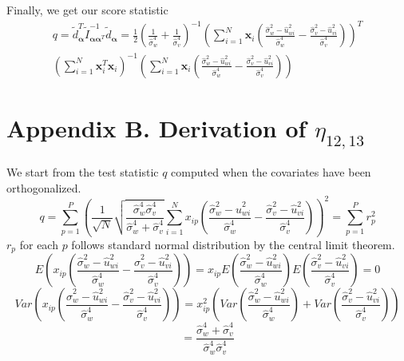 \documentclass[aap,authoryear, preprint]{imsart}
\numberwithin{equation}{section}
\theoremstyle{plain}
\begin{document}
Finally, we get our score statistic
\begin{equation}
    \begin{multlined}
    q = \tilde{d}_{\bm{\alpha}}^T \tilde{I}_{\bm{\alpha}\bm{\alpha}^T}^{-1}
    \tilde{d}_{\bm{\alpha}}
    =\frac{1}{2}\left( \frac{1}{\hat{\sigma}_w^4}+\frac{1}{\hat{\sigma}_v^4}\right)^{-1}
\left(\sum_{i=1}^{N} \bm{x}_{i} 
\left(
\frac{\hat{\sigma}_w^2-\hat{u}_{wi}^2}{\hat{\sigma}_w^4}- \frac{\hat{\sigma}_v^2-\hat{u}_{vi}^2}{\hat{\sigma}_v^4}
\right)
\right)^T \\
\left( \sum_{i=1}^{N} \bm{x}_i^T \bm{x}_i \right)^{-1}
\left(
\sum_{i=1}^{N} \bm{x}_{i} 
\left(
\frac{\hat{\sigma}_w^2-\hat{u}_{wi}^2}{\hat{\sigma}_w^4}- \frac{\hat{\sigma}_v^2-\hat{u}_{vi}^2}{\hat{\sigma}_v^4}
\right)
\right)
    \end{multlined}
\end{equation}


\section*{Appendix B. Derivation of $\eta_{12,13}$}
We start from the test statistic $q$ computed when the covariates have been orthogonalized.
$$q = \sum_{p=1}^{P}
 \left(\frac{1}{\sqrt{N}}
 \sqrt{\frac{\hat{\sigma}_w^4 \hat{\sigma}_v^4}{\hat{\sigma}_w^4 + \hat{\sigma}_v^4}}
 \sum_{i=1}^{N} x_{ip} \left( \frac{\hat{\sigma}_w^2 - \hat{u}_{wi}^2}{\hat{\sigma}_w^4}
 - \frac{\hat{\sigma}_v^2 - \hat{u}_{vi}^2}{\hat{\sigma}_v^4}
 \right)
\right)^2 = \sum_{p=1}^{P}r_p^2$$
$r_p$ for each $p$ follows standard normal distribution by the central limit theorem. 
$$E\left(x_{ip}\left( \frac{\hat{\sigma}_w^2 - \hat{u}_{wi}^2}{\hat{\sigma}_w^4}
 - \frac{\hat{\sigma}_v^2 - \hat{u}_{vi}^2}{\hat{\sigma}_v^4}
 \right)\right) = x_{ip} E\left( \frac{\hat{\sigma}_w^2 - \hat{u}_{wi}^2}{\hat{\sigma}_w^4} \right) E\left( \frac{\hat{\sigma}_v^2 - \hat{u}_{vi}^2}{\hat{\sigma}_v^4}
 \right) = 0$$
$$Var\left(x_{ip}\left( \frac{\hat{\sigma}_w^2 - \hat{u}_{wi}^2}{\hat{\sigma}_w^4}
- \frac{\hat{\sigma}_v^2 - \hat{u}_{vi}^2}{\hat{\sigma}_v^4}
\right)\right) = 
x_{ip}^2 \left( Var\left( \frac{\hat{\sigma}_w^2 - \hat{u}_{wi}^2}{\hat{\sigma}_w^4} \right)  + Var\left( \frac{\hat{\sigma}_v^2 - \hat{u}_{vi}^2}{\hat{\sigma}_v^4}\right)\right)$$
 $$ = \frac{\hat{\sigma}_w^4 + \hat{\sigma}_v^4}{\hat{\sigma}_w^4 \hat{\sigma}_v^4}$$
\end{document}
